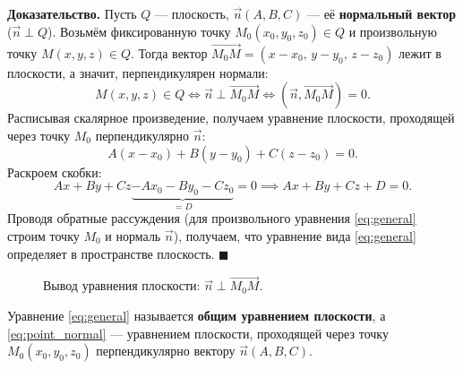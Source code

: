 \documentclass[12pt,a4paper]{article}
\newenvironment{myproof}{\noindent\textbf{Доказательство.}}{\hfill$\blacksquare$}
\begin{document}
\begin{myproof}
  Пусть $Q$ --- плоскость, $\vec{n}(A,B,C)$ --- её \textbf{нормальный
  вектор} ($\vec{n} \perp Q$). Возьмём фиксированную точку
  $M_0(x_0,y_0,z_0) \in Q$ и произвольную точку $M(x,y,z) \in Q$. Тогда
  вектор $\overrightarrow{M_0M} = (x-x_0,\, y-y_0,\, z-z_0)$ лежит в
  плоскости, а значит, перпендикулярен нормали:
  \[
    M(x,y,z) \in Q \iff \vec{n} \perp \overrightarrow{M_0M} \iff
    (\vec{n}, \overrightarrow{M_0M}) = 0.
  \]
  Расписывая скалярное произведение, получаем уравнение плоскости,
  проходящей через точку $M_0$ перпендикулярно $\vec{n}$:
  \begin{equation}
    A(x - x_0) + B(y - y_0) + C(z - z_0) = 0.
    \tag{10.2}\label{eq:point_normal}
  \end{equation}
  Раскроем скобки:
  \[
    Ax + By + Cz \underbrace{- Ax_0 - By_0 - Cz_0}_{= D} = 0
    \implies Ax + By + Cz + D = 0.
  \]
  Проводя обратные рассуждения (для произвольного уравнения
  \eqref{eq:general} строим точку $M_0$ и нормаль $\vec{n}$), получаем,
  что уравнение вида \eqref{eq:general} определяет в пространстве
  плоскость.
\end{myproof}

\begin{figure}[h!]
  \centering
  \caption{Вывод уравнения плоскости: $\vec{n}\perp\overrightarrow{M_0M}$.}
  \label{fig:plane_proof}
\end{figure}

\noindent Уравнение \eqref{eq:general} называется \textbf{общим
уравнением плоскости}, а \eqref{eq:point_normal} --- уравнением
плоскости, проходящей через точку $M_0(x_0,y_0,z_0)$ перпендикулярно
вектору $\vec{n}(A,B,C)$.
\end{document}
